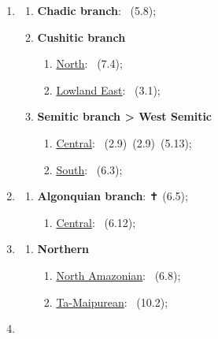 \begin{enumerate}
    \item \MakeUppercase{\textbf{\langfamily{\famAfroasiatic}}}
\begin{enumerate}
    \item \textbf{Chadic branch}: \langnameHausa\ (5.8);
    \item \textbf{Cushitic branch}
    \begin{enumerate}
        \item \uline{North}: \langnameBeja\ (7.4);
        \item \uline{Lowland East}: \langnameSomali\ (3.1);
    \end{enumerate}
    \item \textbf{Semitic branch > West Semitic}
    \begin{enumerate}
        \item \uline{Central}: \langnameArabic\ (2.9)\EnumComma\langnameHebrew\ (2.9)\EnumComma\langnameMaltese\ (5.13);
        \item \uline{South}: \langnameGeez\ (6.3);
    \end{enumerate}
\end{enumerate}
    \item \MakeUppercase{\textbf{\langfamily{\famAlgic}}}
    \begin{enumerate}
        \item \textbf{Algonquian branch}: \langnameProtoAlgonquian{} ✝ (6.5);
        \begin{enumerate}
            \item \uline{Central}: \langnameCree\ (6.12);
        \end{enumerate}
    \end{enumerate}
    \item \MakeUppercase{\textbf{\langfamily{\famArawakan}}}
    \begin{enumerate}
        \item \textbf{Northern}
        \begin{enumerate}
            \item \uline{North Amazonian}: \langnameTariana\ (6.8);
            \item \uline{Ta-Maipurean}: \langnameArawak\ (10.2);
        \end{enumerate}
    \end{enumerate}
    \item \MakeUppercase{\textbf{\langfamily{\famAustroasiatic}}}
    \begin{enumerate}

\end{enumerate}
\end{enumerate}
